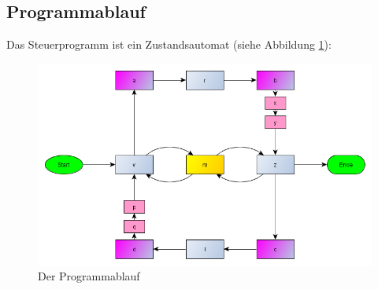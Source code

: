\documentclass[a4paper,bibtotoc,oneside]{scrbook}
\begin{document}
\subsection{Programmablauf}\thispagestyle{empty}


Das Steuerprogramm ist ein Zustandsautomat (siehe Abbildung \ref{abl}):
\begin{figure}[!]
\centering
\includegraphics[width=150mm]{img/ablauf2.png}
\caption{Der Programmablauf}\label{abl}
\end{figure}
\end{document}
